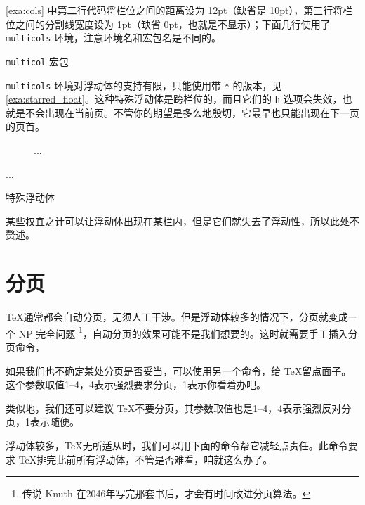 \autoref{exa:cols} 中第二行代码将栏位之间的距离设为 12pt（缺省是 10pt），第三行将栏位之间的分割线宽度设为 1pt（缺省 0pt，也就是不显示）；下面几行使用了 \texttt{multicols} 环境，注意环境名和宏包名是不同的。

\begin{example}[htbp]
\caption{\texttt{multicol} 宏包}
\label{exa:cols}
\end{example}

\texttt{multicols} 环境对浮动体的支持有限，只能使用带 \texttt{*} 的版本，见 \autoref{exa:starred_float}。这种特殊浮动体是跨栏位的，而且它们的 \texttt{h} 选项会失效，也就是不会出现在当前页。不管你的期望是多么地殷切，它最早也只能出现在下一页的页首。

\begin{example}[htbp]
\begin{Code}[]
\begin{figure*}[tbp]
...
\end{figure*}

\begin{table*}[tbp]
...
\end{table*}
\end{Code}
\caption{特殊浮动体}
\label{exa:starred_float}
\end{example}

某些权宜之计可以让浮动体出现在某栏内，但是它们就失去了浮动性，所以此处不赘述。

\section{分页}

\TeX 通常都会自动分页，无须人工干涉。但是浮动体较多的情况下，分页就变成一个 NP 完全问题 \footnote{传说 Knuth 在2046年写完那套书后，才会有时间改进分页算法。}，自动分页的效果可能不是我们想要的。这时就需要手工插入分页命令，

\begin{Code}[numbers=none]
\newpage
\end{Code}

如果我们也不确定某处分页是否妥当，可以使用另一个命令，给 \TeX 留点面子。这个参数取值1--4，4表示强烈要求分页，1表示你看着办吧。

\begin{Code}[numbers=none]
\pagebreak[3]
\end{Code}

类似地，我们还可以建议 \TeX 不要分页，其参数取值也是1--4，4表示强烈反对分页，1表示随便。

\begin{Code}[numbers=none]
\nopagebreak[2]
\end{Code}

浮动体较多，\TeX 无所适从时，我们可以用下面的命令帮它减轻点责任。此命令要求 \TeX 排完此前所有浮动体，不管是否难看，咱就这么办了。

\begin{Code}[numbers=none]
\clearpage
\end{Code}



